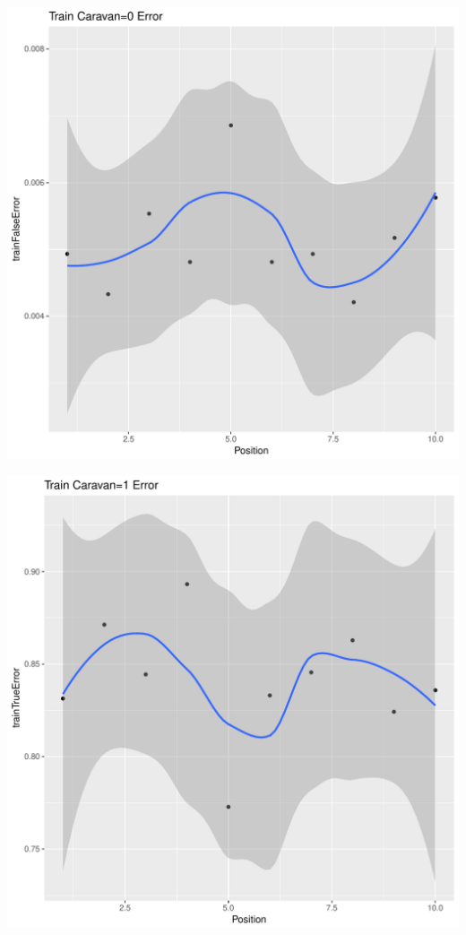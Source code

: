 \documentclass{article}\usepackage[]{graphicx}\usepackage[]{color}
\makeatletter
\def\maxwidth{ %
  \ifdim\Gin@nat@width>\linewidth
    \linewidth
  \else
    \Gin@nat@width
  \fi
}
\newenvironment{kframe}{%
 \def\at@end@of@kframe{}%
 \ifinner\ifhmode%
  \def\at@end@of@kframe{\end{minipage}}%
  \begin{minipage}{\columnwidth}%
 \fi\fi%
 \def\FrameCommand##1{\hskip\@totalleftmargin \hskip-\fboxsep
 \colorbox{shadecolor}{##1}\hskip-\fboxsep
     \hskip-\linewidth \hskip-\@totalleftmargin \hskip\columnwidth}%
 \MakeFramed {\advance\hsize-\width
   \@totalleftmargin\z@ \linewidth\hsize
   \@setminipage}}%
 {\par\unskip\endMakeFramed%
 \at@end@of@kframe}
\newenvironment{knitrout}{}{} %
\makeatother
\begin{document}
\begin{knitrout}
\begin{kframe}
{\ttfamily\noindent\itshape\color{messagecolor}{\#\# `geom\_smooth()` using method = 'loess'}}\end{kframe}
\includegraphics[width=\maxwidth]{figure/unnamed-chunk-31-2} 
\begin{kframe}

{\ttfamily\noindent\itshape\color{messagecolor}{\#\# `geom\_smooth()` using method = 'loess'}}\end{kframe}
\includegraphics[width=\maxwidth]{figure/unnamed-chunk-31-3} 
\begin{kframe}


\end{kframe}
\end{knitrout}
\end{document}

